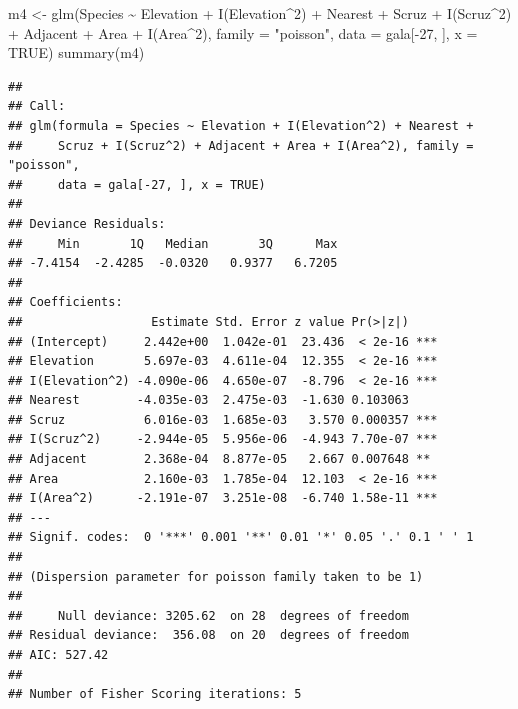 \documentclass[
  ignorenonframetext,
]{beamer}
\newenvironment{Shaded}{\begin{snugshade}}{\end{snugshade}}
\newcommand{\AttributeTok}[1]{\textcolor[rgb]{0.77,0.63,0.00}{#1}}
\newcommand{\ConstantTok}[1]{\textcolor[rgb]{0.00,0.00,0.00}{#1}}
\newcommand{\DecValTok}[1]{\textcolor[rgb]{0.00,0.00,0.81}{#1}}
\newcommand{\FunctionTok}[1]{\textcolor[rgb]{0.00,0.00,0.00}{#1}}
\newcommand{\NormalTok}[1]{#1}
\newcommand{\OtherTok}[1]{\textcolor[rgb]{0.56,0.35,0.01}{#1}}
\newcommand{\SpecialCharTok}[1]{\textcolor[rgb]{0.00,0.00,0.00}{#1}}
\newcommand{\StringTok}[1]{\textcolor[rgb]{0.31,0.60,0.02}{#1}}
\begin{document}
\begin{frame}[fragile]{}
\protect\hypertarget{section-13}{}
\tiny

\begin{Shaded}
\begin{Highlighting}[]
\NormalTok{m4 }\OtherTok{\textless{}{-}} \FunctionTok{glm}\NormalTok{(Species }\SpecialCharTok{\textasciitilde{}}\NormalTok{ Elevation }\SpecialCharTok{+} \FunctionTok{I}\NormalTok{(Elevation}\SpecialCharTok{\^{}}\DecValTok{2}\NormalTok{) }\SpecialCharTok{+}\NormalTok{ Nearest }\SpecialCharTok{+}\NormalTok{ Scruz }\SpecialCharTok{+} 
            \FunctionTok{I}\NormalTok{(Scruz}\SpecialCharTok{\^{}}\DecValTok{2}\NormalTok{) }\SpecialCharTok{+}\NormalTok{ Adjacent }\SpecialCharTok{+}\NormalTok{ Area }\SpecialCharTok{+} \FunctionTok{I}\NormalTok{(Area}\SpecialCharTok{\^{}}\DecValTok{2}\NormalTok{), }\AttributeTok{family =} \StringTok{"poisson"}\NormalTok{,}
            \AttributeTok{data =}\NormalTok{ gala[}\SpecialCharTok{{-}}\DecValTok{27}\NormalTok{, ], }\AttributeTok{x =} \ConstantTok{TRUE}\NormalTok{)}
\FunctionTok{summary}\NormalTok{(m4)}
\end{Highlighting}
\end{Shaded}

\begin{verbatim}
## 
## Call:
## glm(formula = Species ~ Elevation + I(Elevation^2) + Nearest + 
##     Scruz + I(Scruz^2) + Adjacent + Area + I(Area^2), family = "poisson", 
##     data = gala[-27, ], x = TRUE)
## 
## Deviance Residuals: 
##     Min       1Q   Median       3Q      Max  
## -7.4154  -2.4285  -0.0320   0.9377   6.7205  
## 
## Coefficients:
##                  Estimate Std. Error z value Pr(>|z|)    
## (Intercept)     2.442e+00  1.042e-01  23.436  < 2e-16 ***
## Elevation       5.697e-03  4.611e-04  12.355  < 2e-16 ***
## I(Elevation^2) -4.090e-06  4.650e-07  -8.796  < 2e-16 ***
## Nearest        -4.035e-03  2.475e-03  -1.630 0.103063    
## Scruz           6.016e-03  1.685e-03   3.570 0.000357 ***
## I(Scruz^2)     -2.944e-05  5.956e-06  -4.943 7.70e-07 ***
## Adjacent        2.368e-04  8.877e-05   2.667 0.007648 ** 
## Area            2.160e-03  1.785e-04  12.103  < 2e-16 ***
## I(Area^2)      -2.191e-07  3.251e-08  -6.740 1.58e-11 ***
## ---
## Signif. codes:  0 '***' 0.001 '**' 0.01 '*' 0.05 '.' 0.1 ' ' 1
## 
## (Dispersion parameter for poisson family taken to be 1)
## 
##     Null deviance: 3205.62  on 28  degrees of freedom
## Residual deviance:  356.08  on 20  degrees of freedom
## AIC: 527.42
## 
## Number of Fisher Scoring iterations: 5
\end{verbatim}
\end{frame}
\end{document}
